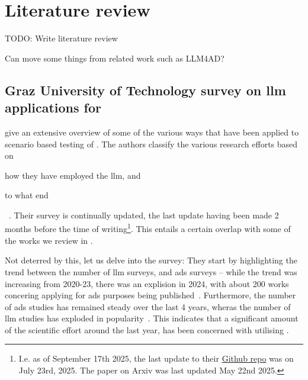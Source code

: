 \chapter{Literature review}\label{sec:literatureReview}

TODO: Write literature review

Can move some things from related work such as LLM4AD?

\section{Graz University of Technology survey on \acrshort{llm} applications for
  } %

\citeauthor{surveyLLMScenarioBasedTesting} give an extensive overview of some of the various ways
that  have been applied to scenario based testing of .
The authors classify the various research efforts based on \begin{inparaenum}
    \item how they have employed the \acrshort{llm}, and
    \item to what end
\end{inparaenum}~\cite{surveyLLMScenarioBasedTesting}.
Their survey is continually updated, the last update having been made 2 months before the time of
writing\footnote{I.e. as of September 17th 2025, the last update to their
    \href{https://github.com/ftgTUGraz/LLM4ADSTest}{Github repo} was on July 23rd, 2025. The paper on
    Arxiv was last updated May 22nd 2025.}. This entails a certain overlap with some of the works we
review in .

Not deterred by this, let us delve into the survey:
They start by highlighting the trend between the number of \acrshort{llm} surveys, and
\acrshort{ads} surveys -- while the trend was increasing from 2020-23, there was an explision in
\num{2024}, with about \num{200} works concering applying  for \acrlong{ads}
purposes being published~\cite[p. 1, figure (b)]{surveyLLMScenarioBasedTesting}. Furthermore, the
number of \acrshort{ads} studies has remained steady over the last \num{4}  years, wheras the number
of \acrshort{llm} studies has exploded in popularity~\cite[p. 1, figure
    (a)]{surveyLLMScenarioBasedTesting}. This indicates that a significant amount of the scientific
effort around  the last year, has been concerned with utilising .

